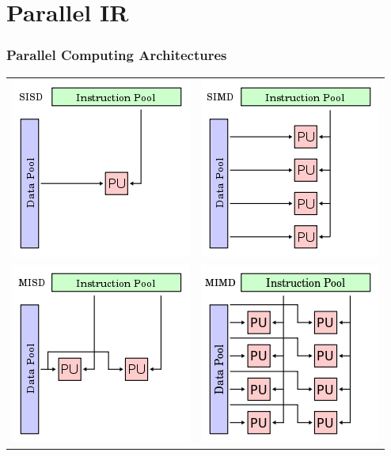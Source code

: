 \documentclass{beamer}
\begin{document}
\section{Parallel IR}

\begin{frame}
    \frametitle{Parallel Computing Architectures}
    
    \centering
    \begin{tabular}{cc}
      \includegraphics[width=.35\textwidth]{sisd} & \includegraphics[width=.35\textwidth]{simd} \\
      \includegraphics[width=.35\textwidth]{misd} & \includegraphics[width=.35\textwidth]{mimd} \\
    \end{tabular}
\end{frame}
\end{document}
